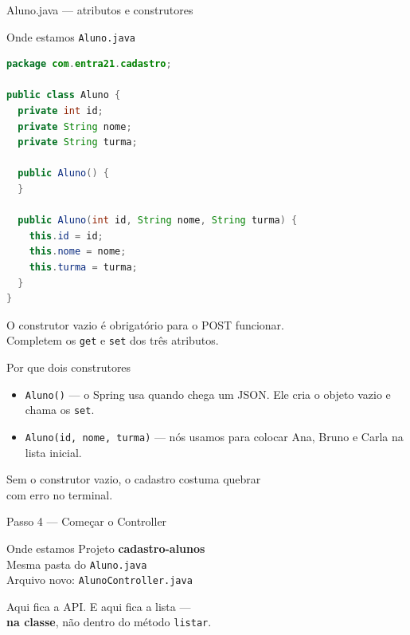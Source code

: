 \documentclass[aspectratio=169,11pt]{beamer}
\newcommand{\onde}[1]{%
  \begin{block}{Onde estamos}
    #1
  \end{block}
}
\begin{document}
\begin{frame}[fragile]{Aluno.java --- atributos e construtores}
  \onde{\texttt{Aluno.java}}

\begin{lstlisting}[language=Java,basicstyle=\ttfamily\footnotesize]
package com.entra21.cadastro;

public class Aluno {
  private int id;
  private String nome;
  private String turma;

  public Aluno() {
  }

  public Aluno(int id, String nome, String turma) {
    this.id = id;
    this.nome = nome;
    this.turma = turma;
  }
}
\end{lstlisting}

  O construtor vazio é obrigatório para o POST funcionar.\\
  Completem os \texttt{get} e \texttt{set} dos três atributos.
\end{frame}

\begin{frame}{Por que dois construtores}
  \begin{itemize}
    \item \texttt{Aluno()} --- o Spring usa quando chega um JSON.
          Ele cria o objeto vazio e chama os \texttt{set}.
    \item \texttt{Aluno(id, nome, turma)} --- nós usamos para
          colocar Ana, Bruno e Carla na lista inicial.
  \end{itemize}

  \vspace{0.6em}
  Sem o construtor vazio, o cadastro costuma quebrar\\
  com erro no terminal.
\end{frame}

\begin{frame}[fragile]{Passo 4 --- Começar o Controller}
  \onde{Projeto \textbf{cadastro-alunos}\\
        Mesma pasta do \texttt{Aluno.java}\\
        Arquivo novo: \texttt{AlunoController.java}}

  Aqui fica a API. E aqui fica a lista ---\\
  \textbf{na classe}, não dentro do método \texttt{listar}.
\end{frame}
\end{document}

